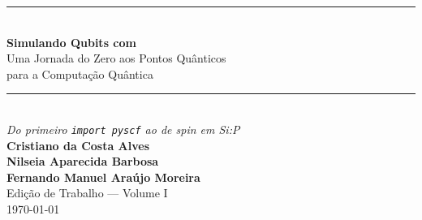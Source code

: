 
\begin{titlepage}
  \centering
  \vspace*{2.5cm}
  {\color{azulpyscf}\rule{\textwidth}{2pt}}\\[0.6cm]
  {\Huge\sffamily\bfseries\color{azulpyscf}
   Simulando Qubits com \pyscf}\\[0.4cm]
  {\LARGE\sffamily Uma Jornada do Zero aos Pontos Quânticos\\
   para a Computação Quântica}\\[0.4cm]
  {\color{azulpyscf}\rule{\textwidth}{2pt}}\\[1.5cm]

  {\Large\itshape Do primeiro \texttt{import pyscf} ao \qubit{} de spin em Si:P}\\[3cm]

  {\LARGE\sffamily\bfseries Cristiano da Costa Alves}\\[0.35cm]
  {\LARGE\sffamily\bfseries Nilseia Aparecida Barbosa}\\[0.35cm]
  {\LARGE\sffamily\bfseries Fernando Manuel Araújo Moreira}\\[1cm]

  \vfill
  {\large Edição de Trabalho --- Volume I}\\[0.3cm]
  {\large \today}
\end{titlepage}
